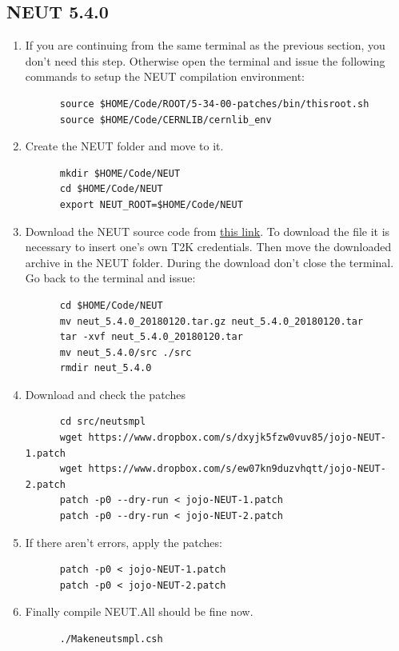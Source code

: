 \subsection{NEUT 5.4.0}
\begin{enumerate}[resume]
\item If you are continuing from the same terminal as the previous section, you
  don't need this step. Otherwise open the terminal and issue the following
  commands to setup the NEUT compilation environment:
\begin{lstlisting}
      source $HOME/Code/ROOT/5-34-00-patches/bin/thisroot.sh
      source $HOME/Code/CERNLIB/cernlib_env
\end{lstlisting}
\item Create the NEUT folder and move to it.
\begin{lstlisting}
      mkdir $HOME/Code/NEUT
      cd $HOME/Code/NEUT
      export NEUT_ROOT=$HOME/Code/NEUT
\end{lstlisting}
\item Download the NEUT source code from
  \href{https://www.t2k.org/asg/xsec/niwgdocs/neut/NEUT5.4.0}{this link}. To
  download the file it is necessary to insert one's own T2K credentials. Then
  move the downloaded archive in the NEUT folder. During the download don't
  close the terminal. Go back to the terminal and issue:
\begin{lstlisting}
      cd $HOME/Code/NEUT
      mv neut_5.4.0_20180120.tar.gz neut_5.4.0_20180120.tar
      tar -xvf neut_5.4.0_20180120.tar
      mv neut_5.4.0/src ./src
      rmdir neut_5.4.0
\end{lstlisting}
\item Download and check the patches
\begin{lstlisting}
      cd src/neutsmpl
      wget https://www.dropbox.com/s/dxyjk5fzw0vuv85/jojo-NEUT-1.patch
      wget https://www.dropbox.com/s/ew07kn9duzvhqtt/jojo-NEUT-2.patch
      patch -p0 --dry-run < jojo-NEUT-1.patch
      patch -p0 --dry-run < jojo-NEUT-2.patch
\end{lstlisting}
\item If there aren't errors, apply the patches:
\begin{lstlisting}
      patch -p0 < jojo-NEUT-1.patch
      patch -p0 < jojo-NEUT-2.patch
\end{lstlisting}
\item Finally compile NEUT.\@ All should be fine now.
\begin{lstlisting}
      ./Makeneutsmpl.csh
\end{lstlisting}
\end{enumerate}

